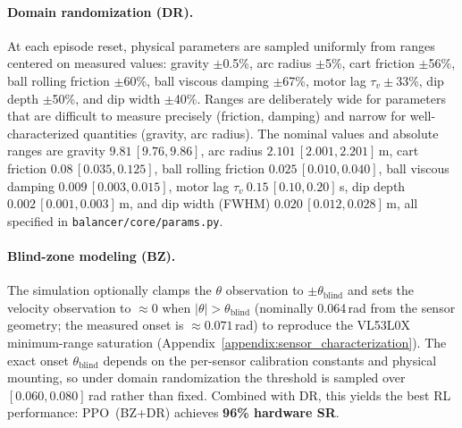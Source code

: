 \paragraph{Domain randomization (DR).}
At each episode reset, physical parameters are sampled uniformly
from ranges centered on measured values: gravity $\pm$0.5\%,
arc radius $\pm$5\%, cart friction $\pm$56\%, ball rolling
friction $\pm$60\%, ball viscous damping $\pm$67\%,
motor lag $\tau_v \pm$33\%, dip depth $\pm$50\%,
and dip width $\pm$40\%. Ranges are deliberately wide for
parameters that are difficult to measure precisely (friction,
damping) and narrow for well-characterized quantities (gravity,
arc radius). The nominal values and absolute ranges are gravity
$9.81\,[9.76, 9.86]$, arc radius $2.101\,[2.001, 2.201]$\,m, cart
friction $0.08\,[0.035, 0.125]$, ball rolling friction
$0.025\,[0.010, 0.040]$, ball viscous damping $0.009\,[0.003, 0.015]$,
motor lag $\tau_v\ 0.15\,[0.10, 0.20]$\,s, dip depth
$0.002\,[0.001, 0.003]$\,m, and dip width (FWHM)
$0.020\,[0.012, 0.028]$\,m, all specified in
\texttt{balancer/core/params.py}.

\paragraph{Blind-zone modeling (BZ).}
The simulation optionally clamps the $\theta$ observation to
$\pm\theta_\text{blind}$ and sets the velocity observation to $\approx 0$
when $|\theta| > \theta_\text{blind}$ (nominally 0.064\,rad from the sensor
geometry; the measured onset is ${\approx}0.071$\,rad) to reproduce the
VL53L0X minimum-range saturation
(Appendix~\ref{appendix:sensor_characterization}). The exact onset
$\theta_\text{blind}$ depends on the per-sensor calibration constants and
physical mounting, so under domain randomization the threshold is
sampled over $[0.060, 0.080]$\,rad rather than fixed. Combined with DR,
this yields the best RL performance:
PPO~(BZ+DR) achieves \textbf{96\% hardware SR}.

